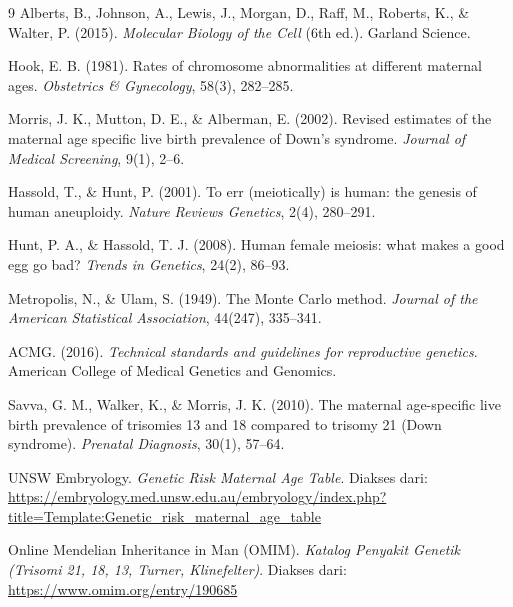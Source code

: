 \documentclass[10pt,a4paper,twocolumn]{article}
\begin{document}
\begin{thebibliography}{9}
\scriptsize
{}
Alberts, B., Johnson, A., Lewis, J., Morgan, D., Raff, M., Roberts, K., \& Walter, P. (2015).
\textit{Molecular Biology of the Cell} (6th ed.). Garland Science.

Hook, E. B. (1981). Rates of chromosome abnormalities at different maternal ages.
\textit{Obstetrics \& Gynecology}, 58(3), 282--285.

Morris, J. K., Mutton, D. E., \& Alberman, E. (2002). Revised estimates of the maternal age
specific live birth prevalence of Down's syndrome.
\textit{Journal of Medical Screening}, 9(1), 2--6.

Hassold, T., \& Hunt, P. (2001). To err (meiotically) is human: the genesis of human
aneuploidy. \textit{Nature Reviews Genetics}, 2(4), 280--291.

Hunt, P. A., \& Hassold, T. J. (2008). Human female meiosis: what makes a good egg go bad?
\textit{Trends in Genetics}, 24(2), 86--93.

Metropolis, N., \& Ulam, S. (1949). The Monte Carlo method.
\textit{Journal of the American Statistical Association}, 44(247), 335--341.

ACMG. (2016). \textit{Technical standards and guidelines for reproductive genetics}.
American College of Medical Genetics and Genomics.

Savva, G. M., Walker, K., \& Morris, J. K. (2010). The maternal age-specific live birth prevalence of trisomies 13 and 18 compared to trisomy 21 (Down syndrome). \textit{Prenatal Diagnosis}, 30(1), 57--64.

UNSW Embryology. \textit{Genetic Risk Maternal Age Table}.
Diakses dari: \url{https://embryology.med.unsw.edu.au/embryology/index.php?title=Template:Genetic_risk_maternal_age_table}

Online Mendelian Inheritance in Man (OMIM). \textit{Katalog Penyakit Genetik (Trisomi 21, 18, 13, Turner, Klinefelter)}.
Diakses dari: \url{https://www.omim.org/entry/190685}
\end{thebibliography}
\end{document}
